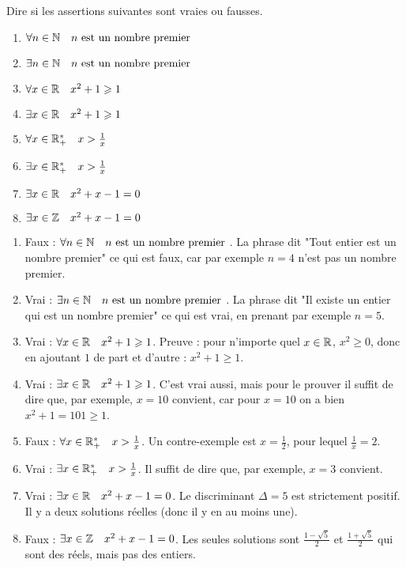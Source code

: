 \documentclass[11pt,class=report,crop=false]{standalone}
\begin{document}
\exercice{}
\enonce
Dire si les assertions suivantes sont vraies ou fausses.
\begin{enumerate}
    \item $\forall n \in \mathbb{N}  \quad n \text{ est un nombre premier }$
    \item $\exists n \in \mathbb{N}  \quad n \text{ est un nombre premier }$
    \item $\forall x \in \mathbb{R}  \quad x^2+1 \geqslant 1$      
    \item $\exists x \in \mathbb{R}  \quad x^2+1 \geqslant 1$  
    \item $\forall x \in \mathbb{R}^*_+  \quad x > \frac 1x$         
    \item $\exists x \in \mathbb{R}^*_+  \quad x > \frac 1x$
    \item $\exists x \in \mathbb{R}  \quad x^2+x-1 = 0$         
    \item $\exists x \in \mathbb{Z}  \quad x^2+x-1 = 0$                 
\end{enumerate} 
\finenonce

\noindication

\correction
\sauteligne
\begin{enumerate}
    \item Faux : $\forall n \in \mathbb{N}  \quad n \text{ est un nombre premier }$. La phrase dit "Tout entier est un nombre premier" ce qui est faux, car par exemple $n=4$ n'est pas un nombre premier.
    
    \item  Vrai : $\exists n \in \mathbb{N}  \quad n \text{ est un nombre premier }$. La phrase dit "Il existe un entier qui est un nombre premier" ce qui est vrai, en prenant par exemple $n=5$.
    
    \item  Vrai :  $\forall x \in \mathbb{R}  \quad x^2+1 \geqslant 1$. Preuve : pour n'importe quel $x\in\mathbb{R}$, $x^2 \ge 0$, donc en ajoutant $1$ de part et d'autre : $x^2+1 \ge 1$.
        
    \item Vrai :  $\exists x \in \mathbb{R}  \quad x^2+1 \geqslant 1$. C'est vrai aussi, mais pour le prouver il suffit de dire que, par exemple, $x= 10$ convient, car pour $x=10$ on a bien $x^2+1 = 101 \ge 1$.
      
    \item Faux : $\forall x \in \mathbb{R}^*_+  \quad x > \frac 1x$. Un contre-exemple est $x=\frac12$, pour lequel $\frac1x = 2$.
    
    \item Vrai : $\exists x \in \mathbb{R}^*_+  \quad x > \frac 1x$. Il suffit de dire que, par exemple, $x= 3$ convient.
    
    \item Vrai : $\exists x \in \mathbb{R}  \quad x^2+x-1 = 0$. Le discriminant $\Delta = 5$ est strictement positif. Il y a deux solutions réelles (donc il y en au moins une).
             
    \item Faux : $\exists x \in \mathbb{Z}  \quad x^2+x-1 = 0$. Les seules solutions sont $\frac{1-\sqrt5}{2}$ et $\frac{1+\sqrt5}{2}$ qui sont des réels, mais pas des entiers.
    
\end{enumerate} 
\fincorrection
\finexercice
\end{document}

